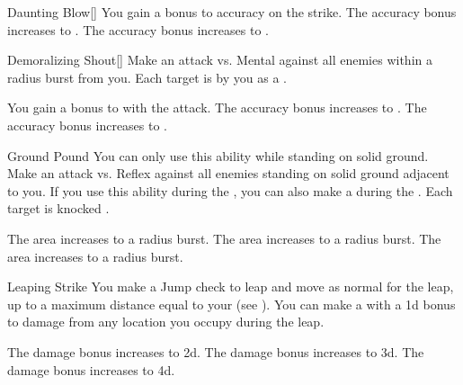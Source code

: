 {\begin{apability}{Daunting Blow}[]
                \rankline
                 You gain a  bonus to accuracy on the strike.
                 The accuracy bonus increases to .
                 The accuracy bonus increases to .
            \end{apability}

            \begin{apability}{Demoralizing Shout}[]
                Make an attack vs. Mental against all enemies within a \arealarge radius burst from you.
                \hit Each target is  by you as a .

                \rankline
                 You gain a  bonus to  with the attack.
                 The accuracy bonus increases to .
                 The accuracy bonus increases to .
            \end{apability}

            \begin{apability}{Ground Pound}
                You can only use this ability while standing on solid ground.
                Make an attack vs. Reflex against all enemies standing on solid ground adjacent to you.
                If you use this ability during the , you can also make a  during the .
                \hit Each target is knocked \prone.

                \rankline
                 The area increases to a \areamed radius burst.
                 The area increases to a \arealarge radius burst.
                 The area increases to a \areahuge radius burst.
            \end{apability}

            \begin{apability}{Leaping Strike}
                You make a Jump check to leap and move as normal for the leap, up to a maximum distance equal to your  (see ).
                You can make a  with a \plus1d bonus to damage from any location you occupy during the leap.

                \rankline
                 The damage bonus increases to \plus2d.
                 The damage bonus increases to \plus3d.
                 The damage bonus increases to \plus4d.
            \end{apability}

}
